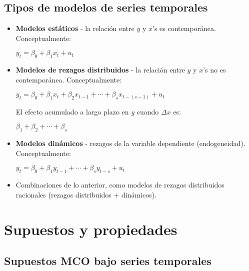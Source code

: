 \documentclass[10pt, a4paper, landscape]{article}
\begin{document}
\begin{multicols}{3}
		\subsection*{Tipos de modelos de series temporales}
		
		\begin{itemize}[leftmargin=*]
			\item \textbf{Modelos estáticos} - la relación entre $y$ y $x$'s es contemporánea. Conceptualmente:
			
			\begin{center}
				$y_{t} = \beta_{0} + \beta_{1} x_{t} + u_{t}$
			\end{center}
			
			\item \textbf{Modelos de rezagos distribuidos} - la relación entre $y$ y $x$'s no es contemporánea. Conceptualmente:
			
			\begin{center}
				$y_{t} = \beta_{0} + \beta_{1} x_{t} + \beta_{2} x_{t - 1} + \cdots + \beta_{s} x_{t - (s - 1)} + u_{t}$
			\end{center}
			
			El efecto acumulado a largo plazo en $y$ cuando $\Delta x$ es:
			
			\begin{center}
				$\beta_{1} + \beta_{2} + \cdots + \beta_{s}$
			\end{center}
			
			\item \textbf{Modelos dinámicos} - rezagos de la variable dependiente (endogeneidad). Conceptualmente:
			
			\begin{center}
				$y_{t} = \beta_{0} + \beta_{1} y_{t - 1} + \cdots + \beta_{s} y_{t - s} + u_{t}$
			\end{center}
			
			\item Combinaciones de lo anterior, como modelos de rezagos distribuidos racionales (rezagos distribuidos + dinámicos).
		\end{itemize}
		
		\columnbreak
		
		\section*{Supuestos y propiedades}
		
		\subsection*{Supuestos MCO bajo series temporales}
		

\end{multicols}
\end{document}
